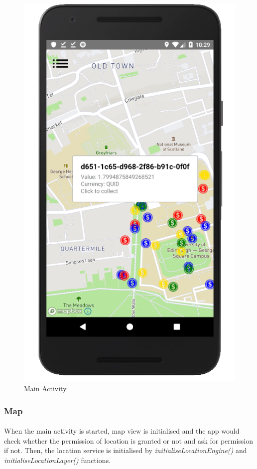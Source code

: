 \documentclass[12pt]{article}
\begin{document}
\begin{figure}
	\includegraphics[scale=0.25]{CoinInfo.png}
	\caption{\label{fig:main}Main Activity}
\end{figure}
\subsubsection{Map}
\paragraph{}
When the main activity is started, map view is initialised and the app would check whether the permission of location is granted or not and ask for permission if not. Then, the location service is initialised by \textit{initialiseLocationEngine()} and \textit{initialiseLocationLayer()} functions.
\end{document}
